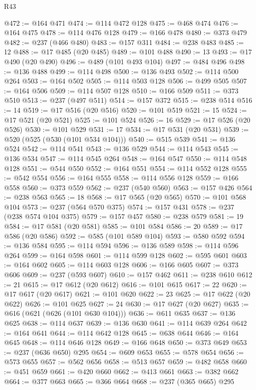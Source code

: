 \begin{lexlean}{R43}
\begin{coremodule}
@472 := @164 @471
@474 := @114 @472 @128
@475 := @468 @474
@476 := @164 @475
@478 := @114 @476 @128
@479 := @166 @478
@480 := @373 @479
@482 := @237 (@466 @480)
@483 := @157 @311
@484 := @238 @483
@485 := 12
@488 := @17 @485 (@20 @485)
@489 := @101 @488
@490 := 13
@493 := @17 @490 (@20 @490)
@496 := @489 (@101 @493 @104)
@497 := @484 @496
@498 := @136 @488
@499 := @114 @498
@500 := @136 @493
@502 := @114 @500 @264
@503 := @164 @502
@505 := @114 @503 @128
@506 := @499 @505
@507 := @164 @506
@509 := @114 @507 @128
@510 := @166 @509
@511 := @373 @510
@513 := @237 (@497 @511)
@514 := @157 @372
@515 := @238 @514
@516 := 14
@519 := @17 @516 (@20 @516)
@520 := @101 @519
@521 := 15
@524 := @17 @521 (@20 @521)
@525 := @101 @524
@526 := 16
@529 := @17 @526 (@20 @526)
@530 := @101 @529
@531 := 17
@534 := @17 @531 (@20 @531)
@539 := @520 (@525 (@530 (@101 @534 @104)))
@540 := @515 @539
@541 := @136 @524
@542 := @114 @541
@543 := @136 @529
@544 := @114 @543
@545 := @136 @534
@547 := @114 @545 @264
@548 := @164 @547
@550 := @114 @548 @128
@551 := @544 @550
@552 := @164 @551
@554 := @114 @552 @128
@555 := @542 @554
@556 := @164 @555
@558 := @114 @556 @128
@559 := @166 @558
@560 := @373 @559
@562 := @237 (@540 @560)
@563 := @157 @426
@564 := @238 @563
@565 := 18
@568 := @17 @565 (@20 @565)
@570 := @101 @568 @104
@573 := @237 (@564 @570 @375)
@574 := @157 @431
@578 := @237 (@238 @574 @104 @375)
@579 := @157 @457
@580 := @238 @579
@581 := 19
@584 := @17 @581 (@20 @581)
@585 := @101 @584
@586 := 20
@589 := @17 @586 (@20 @586)
@592 := @585 (@101 @589 @104)
@593 := @580 @592
@594 := @136 @584
@595 := @114 @594
@596 := @136 @589
@598 := @114 @596 @264
@599 := @164 @598
@601 := @114 @599 @128
@602 := @595 @601
@603 := @164 @602
@605 := @114 @603 @128
@606 := @166 @605
@607 := @373 @606
@609 := @237 (@593 @607)
@610 := @157 @462
@611 := @238 @610
@612 := 21
@615 := @17 @612 (@20 @612)
@616 := @101 @615
@617 := 22
@620 := @17 @617 (@20 @617)
@621 := @101 @620
@622 := 23
@625 := @17 @622 (@20 @622)
@626 := @101 @625
@627 := 24
@630 := @17 @627 (@20 @627)
@635 := @616 (@621 (@626 (@101 @630 @104)))
@636 := @611 @635
@637 := @136 @625
@638 := @114 @637
@639 := @136 @630
@641 := @114 @639 @264
@642 := @164 @641
@644 := @114 @642 @128
@645 := @638 @644
@646 := @164 @645
@648 := @114 @646 @128
@649 := @166 @648
@650 := @373 @649
@653 := @237 (@636 @650) @295
@654 := @609 @653
@655 := @578 @654
@656 := @573 @655
@657 := @562 @656
@658 := @513 @657
@659 := @482 @658
@660 := @451 @659
@661 := @420 @660
@662 := @413 @661
@663 := @382 @662
@664 := @377 @663
@665 := @366 @664
@668 := @237 (@365 @665) @295

\end{coremodule}
\end{lexlean}

